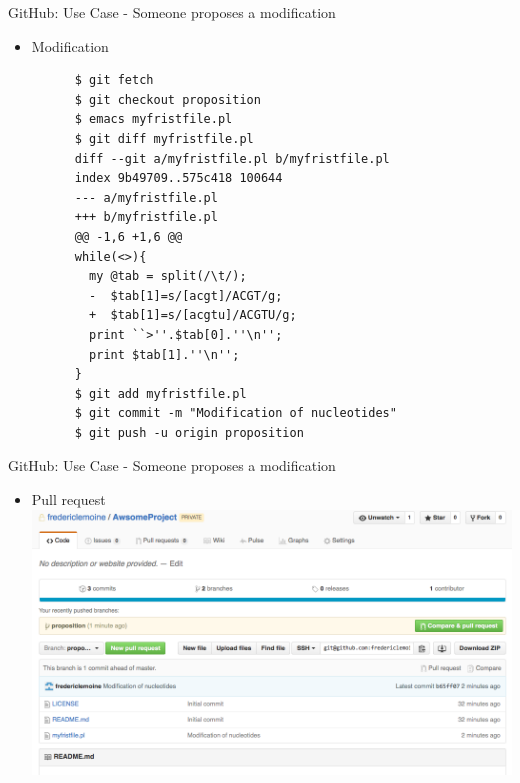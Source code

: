 \begin{frame}[fragile]{GitHub: Use Case - Someone proposes a modification}
  \begin{itemize}
  \item Modification
    \begin{lstlisting}
      $ git fetch
      $ git checkout proposition
      $ emacs myfristfile.pl
      $ git diff myfristfile.pl
      diff --git a/myfristfile.pl b/myfristfile.pl
      index 9b49709..575c418 100644
      --- a/myfristfile.pl
      +++ b/myfristfile.pl
      @@ -1,6 +1,6 @@
      while(<>){
        my @tab = split(/\t/);
        -  $tab[1]=s/[acgt]/ACGT/g;
        +  $tab[1]=s/[acgtu]/ACGTU/g;
        print ``>''.$tab[0].''\n'';
        print $tab[1].''\n'';
      }
      $ git add myfristfile.pl
      $ git commit -m "Modification of nucleotides"
      $ git push -u origin proposition
    \end{lstlisting}
  \end{itemize}
\end{frame}

\begin{frame}[fragile]{GitHub: Use Case - Someone proposes a modification}
  \begin{itemize}
  \item Pull request
    \includegraphics[width=\textwidth]{images/hosting_services_use_case_5.png}
  \end{itemize}
\end{frame}

